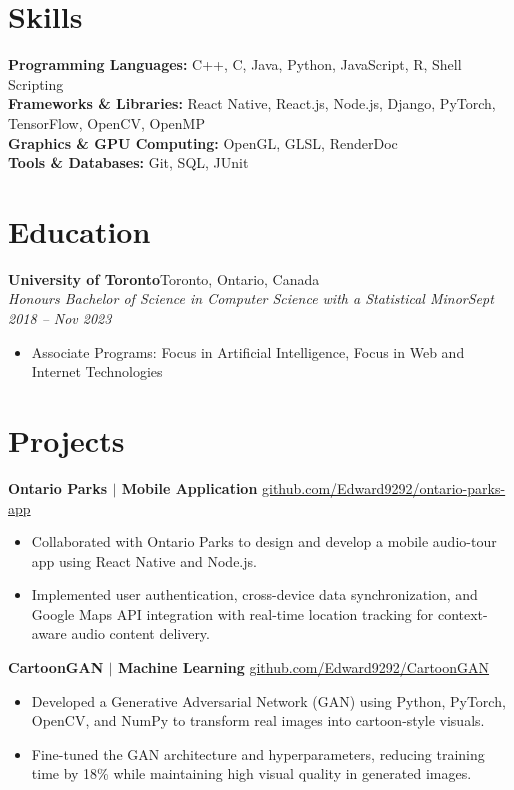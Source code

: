 \documentclass[10pt,letterpaper]{article}
\begin{document}
\section*{Skills}
\textbf{Programming Languages:} C++, C, Java, Python, JavaScript, R, Shell Scripting\\
\textbf{Frameworks \& Libraries:} React Native, React.js, Node.js, Django, PyTorch, TensorFlow, OpenCV, OpenMP\\
\textbf{Graphics \& GPU Computing:} OpenGL, GLSL, RenderDoc\\
\textbf{Tools \& Databases:} Git, SQL, JUnit

\section*{Education}
\textbf{University of Toronto}\hfill Toronto, Ontario, Canada\\
\textit{Honours Bachelor of Science in Computer Science with a Statistical Minor}\hfill \textit{Sept 2018 -- Nov 2023}
\begin{itemize}
  \item Associate Programs: Focus in Artificial Intelligence, Focus in Web and Internet Technologies
\end{itemize}

\section*{Projects}
\textbf{Ontario Parks $|$ Mobile Application}\hfill
\href{https://github.com/Edward9292/ontario-parks-app}{github.com/Edward9292/ontario-parks-app}
\begin{itemize}
  \item Collaborated with Ontario Parks to design and develop a mobile audio-tour app using React Native and Node.js.
  \item Implemented user authentication, cross-device data synchronization, and Google Maps API integration
        with real-time location tracking for context-aware audio content delivery.
\end{itemize}

\vspace{0.2em}
\textbf{CartoonGAN $|$ Machine Learning}\hfill
\href{https://github.com/Edward9292/CartoonGAN/blob/main/report.pdf}{github.com/Edward9292/CartoonGAN}
\begin{itemize}
  \item Developed a Generative Adversarial Network (GAN) using Python, PyTorch, OpenCV, and NumPy to
        transform real images into cartoon-style visuals.
  \item Fine-tuned the GAN architecture and hyperparameters, reducing training time by 18\% while
        maintaining high visual quality in generated images.
\end{itemize}
\end{document}
